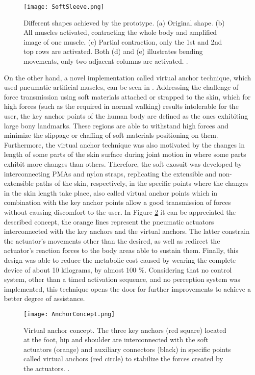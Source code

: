 \begin{figure}[hb!]
    \centering
    \texttt{[image: SoftSleeve.png]}
    \caption{Different shapes achieved by the prototype. (a) Original shape. (b) All muscles activated, contracting the whole body and amplified image of one muscle. (c) Partial contraction, only the 1st and 2nd top rows are activated. Both (d) and (e) illustrates bending movements, only two adjacent columns are activated. \cite{Park2012}. }
    \label{fig:soft_sleeve}
\end{figure}

On the other hand, a novel implementation called virtual anchor technique, which used pneumatic artificial muscles, can be seen in \cite{wehner2013lightweight}. Addressing the challenge of force transmission using soft materials attached or strapped to the skin, which for high forces (such as the required in normal walking) results intolerable for the user, the key anchor points of the human body are defined as the ones exhibiting large bony landmarks. These regions are able to withstand high forces and minimize the slippage or chaffing of soft materials positioning on them. Furthermore, the virtual anchor technique was also motivated by the changes in length of some parts of the skin surface during joint motion in where some parts exhibit more changes than others. Therefore, the soft exosuit was developed by interconnecting PMAs and nylon straps, replicating the extensible and non-extensible paths of the skin, respectively, in the specific points where the changes in the skin length take place, also called virtual anchor points which in combination with the key anchor points allow a good transmission of forces without causing discomfort to the user. In Figure \ref{fig:anchor_concept} it can be appreciated the described concept, the orange lines represent the pneumatic actuators interconnected with the key anchors and the virtual anchors. The latter constrain the actuator's movements other than the desired, as well as redirect the actuator's reaction forces to the body areas able to sustain them. Finally, this design was able to reduce the metabolic cost caused by wearing the complete device of about 10 kilograms, by almost 100 \%. Considering that no control system, other than a timed activation sequence, and no perception system was implemented, this technique opens the door for further improvements to achieve a better degree of assistance.

\begin{figure}[hb!]
    \centering
    \texttt{[image: AnchorConcept.png]}
    \caption{Virtual anchor concept. The three key anchors (red square) located at the foot, hip and shoulder are interconnected with the soft actuators (orange) and auxiliary connectors (black) in specific points called virtual anchors (red circle) to stabilize the forces created by the actuators. \cite{wehner2013lightweight}. }
    \label{fig:anchor_concept}
\end{figure}

